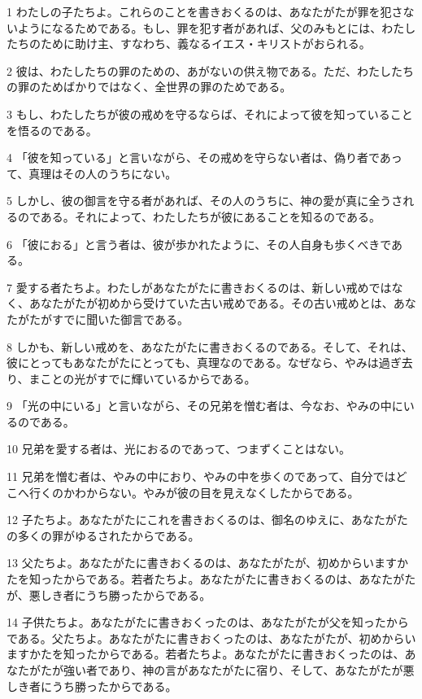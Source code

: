 \par 1 わたしの子たちよ。これらのことを書きおくるのは、あなたがたが罪を犯さないようになるためである。もし、罪を犯す者があれば、父のみもとには、わたしたちのために助け主、すなわち、義なるイエス・キリストがおられる。
\par 2 彼は、わたしたちの罪のための、あがないの供え物である。ただ、わたしたちの罪のためばかりではなく、全世界の罪のためである。
\par 3 もし、わたしたちが彼の戒めを守るならば、それによって彼を知っていることを悟るのである。
\par 4 「彼を知っている」と言いながら、その戒めを守らない者は、偽り者であって、真理はその人のうちにない。
\par 5 しかし、彼の御言を守る者があれば、その人のうちに、神の愛が真に全うされるのである。それによって、わたしたちが彼にあることを知るのである。
\par 6 「彼におる」と言う者は、彼が歩かれたように、その人自身も歩くべきである。
\par 7 愛する者たちよ。わたしがあなたがたに書きおくるのは、新しい戒めではなく、あなたがたが初めから受けていた古い戒めである。その古い戒めとは、あなたがたがすでに聞いた御言である。
\par 8 しかも、新しい戒めを、あなたがたに書きおくるのである。そして、それは、彼にとってもあなたがたにとっても、真理なのである。なぜなら、やみは過ぎ去り、まことの光がすでに輝いているからである。
\par 9 「光の中にいる」と言いながら、その兄弟を憎む者は、今なお、やみの中にいるのである。
\par 10 兄弟を愛する者は、光におるのであって、つまずくことはない。
\par 11 兄弟を憎む者は、やみの中におり、やみの中を歩くのであって、自分ではどこへ行くのかわからない。やみが彼の目を見えなくしたからである。
\par 12 子たちよ。あなたがたにこれを書きおくるのは、御名のゆえに、あなたがたの多くの罪がゆるされたからである。
\par 13 父たちよ。あなたがたに書きおくるのは、あなたがたが、初めからいますかたを知ったからである。若者たちよ。あなたがたに書きおくるのは、あなたがたが、悪しき者にうち勝ったからである。
\par 14 子供たちよ。あなたがたに書きおくったのは、あなたがたが父を知ったからである。父たちよ。あなたがたに書きおくったのは、あなたがたが、初めからいますかたを知ったからである。若者たちよ。あなたがたに書きおくったのは、あなたがたが強い者であり、神の言があなたがたに宿り、そして、あなたがたが悪しき者にうち勝ったからである。
